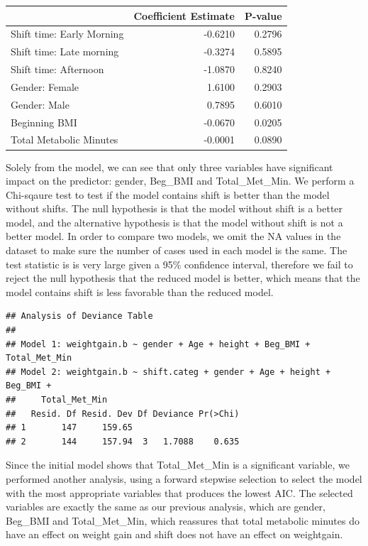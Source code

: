 \documentclass[]{article}
\begin{document}
\begin{tabular}{l|r|r}
\hline
  & Coefficient Estimate & P-value\\
\hline
Shift time: Early Morning & -0.6210 & 0.2796\\
\hline
Shift time: Late morning & -0.3274 & 0.5895\\
\hline
Shift time: Afternoon & -1.0870 & 0.8240\\
\hline
Gender: Female & 1.6100 & 0.2903\\
\hline
Gender: Male & 0.7895 & 0.6010\\
\hline
Beginning BMI & -0.0670 & 0.0205\\
\hline
Total Metabolic Minutes & -0.0001 & 0.0890\\
\hline
\end{tabular}

Solely from the model, we can see that only three variables have
significant impact on the predictor: gender, Beg\_BMI and
Total\_Met\_Min. We perform a Chi-sqaure test to test if the model
contains shift is better than the model without shifts. The null
hypothesis is that the model without shift is a better model, and the
alternative hypothesis is that the model without shift is not a better
model. In order to compare two models, we omit the NA values in the
dataset to make sure the number of cases used in each model is the same.
The test statistic is is very large given a 95\% confidence interval,
therefore we fail to reject the null hypothesis that the reduced model
is better, which means that the model contains shift is less favorable
than the reduced model.

\begin{verbatim}
## Analysis of Deviance Table
## 
## Model 1: weightgain.b ~ gender + Age + height + Beg_BMI + Total_Met_Min
## Model 2: weightgain.b ~ shift.categ + gender + Age + height + Beg_BMI + 
##     Total_Met_Min
##   Resid. Df Resid. Dev Df Deviance Pr(>Chi)
## 1       147     159.65                     
## 2       144     157.94  3   1.7088    0.635
\end{verbatim}

Since the initial model shows that Total\_Met\_Min is a significant
variable, we performed another analysis, using a forward stepwise
selection to select the model with the most appropriate variables that
produces the lowest AIC. The selected variables are exactly the same as
our previous analysis, which are gender, Beg\_BMI and Total\_Met\_Min,
which reassures that total metabolic minutes do have an effect on weight
gain and shift does not have an effect on weightgain.
\end{document}
